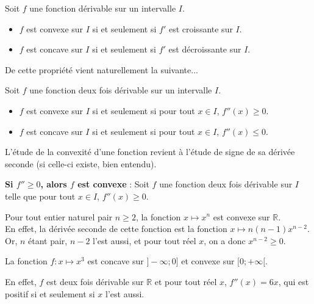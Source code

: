 \documentclass[11pt,fleqn, openany]{book} %
\begin{document}
\begin{proposition}Soit $f$ une fonction dérivable sur un intervalle $I$.
\begin{itemize}
\item $f$ est convexe sur $I$ si et seulement si $f'$ est croissante sur $I$.
\item $f$ est concave sur $I$ si et seulement si $f'$ est décroissante sur $I$.
\end{itemize}\end{proposition}

De cette propriété vient naturellement la suivante...

\begin{proposition}Soit $f$ une fonction deux fois dérivable sur un intervalle $I$.
\begin{itemize}
\item $f$ est convexe sur $I$ si et seulement si pour tout $x\in I$, $f''(x) \geqslant 0$.
\item $f$ est concave sur $I$ si et seulement si pour tout $x\in I$, $f''(x) \leqslant 0$. 
\end{itemize}
\end{proposition}

L'étude de la convexité d'une fonction revient à l'étude de signe de sa dérivée seconde (si celle-ci existe, bien entendu).

\begin{demonstration}\textbf{Si $f''\geqslant 0$, alors $f$ est convexe} : Soit $f$ une fonction deux fois dérivable sur $I$ telle que pour tout $x\in I$, $f''(x) \geqslant 0$.

\vskip200pt
\end{demonstration}
\newpage
\begin{example} Pour tout entier naturel pair $n\geqslant 2$, la fonction $x \mapsto x^n$ est convexe sur $\mathbb{R}$. \\ En effet, la dérivée seconde de cette fonction est la fonction $x\mapsto n(n-1)x^{n-2}$. \\Or, $n$ étant pair, $n-2$ l'est aussi, et pour tout réel $x$, on a donc $x^{n-2}\geqslant 0$.\end{example}

\begin{example}La fonction $f:x\mapsto x^3$ est concave sur $]-\infty ; 0]$ et convexe sur $[0;+\infty[$.

En effet, $f$ est deux fois dérivable sur $\mathbb{R}$ et pour tout réel $x$, $f''(x)=6x$, qui est positif si et seulement si $x$ l'est aussi.\end{example}
\end{document}

